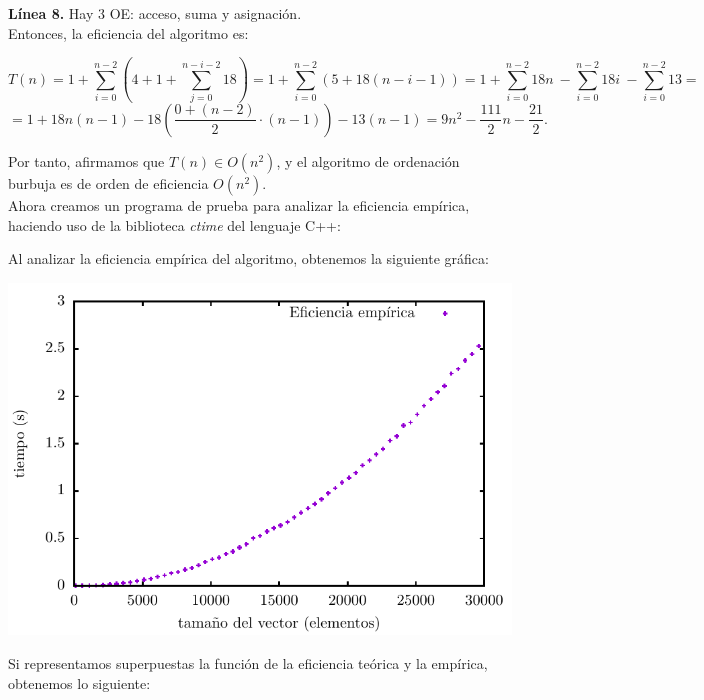 \documentclass[11pt,a4paper]{article}
\begin{document}
\textbf{Línea 8.} Hay 3 OE: acceso, suma y asignación.\\

Entonces, la eficiencia del algoritmo es:

$$ T(n) = 1+ \sum_{i=0}^{n-2} \left( 4 + 1 + \sum_{j=0}^{n-i-2} 18 \right) = 1+ \sum_{i=0}^{n-2} \left( 5 + 18(n-i-1) \right) = 1 + \sum_{i=0}^{n-2} 18n\ - \sum_{i=0}^{n-2} 18i\ - \sum_{i=0}^{n-2} 13 = $$ $$ = 1 + 18n(n-1) - 18 \left( \frac{0 + (n-2)}{2} \cdot (n-1) \right) - 13(n-1) = 9n^2 - \frac{111}{2} n - \frac{21}{2}.$$

Por tanto, afirmamos que $T(n) \in O(n^2)$, y el algoritmo de ordenación burbuja es de orden de eficiencia $O(n^2)$.\\

Ahora creamos un programa de prueba para analizar la eficiencia empírica, haciendo uso de la biblioteca \emph{ctime} del lenguaje C++:



Al analizar la eficiencia empírica del algoritmo, obtenemos la siguiente gráfica:\\

\begin{center}
	\includegraphics{img/tiempos_burbuja.pdf}
\end{center}

Si representamos superpuestas la función de la eficiencia teórica y la empírica, obtenemos lo siguiente:\\
\end{document}
